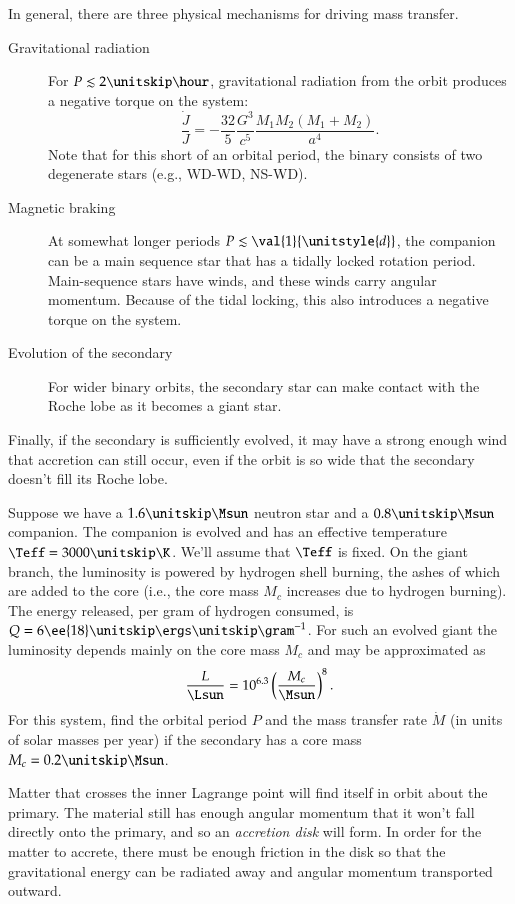 In general, there are three physical mechanisms for driving mass transfer.
\begin{description}
\item[Gravitational radiation] For $P \lesssim 2\nsp\hour$, gravitational radiation from the orbit produces a negative torque on the system:
\begin{equation}\label{e.GR-torque}
\frac{\dot{J}}{J} = -\frac{32}{5}\frac{G^{3}}{c^{5}}\frac{M_{1}M_{2}(M_{1}+M_{2})}{a^{4}}.
\end{equation}
Note that for this short of an orbital period, the binary consists of two degenerate stars (e.g., WD-WD, NS-WD).
\item[Magnetic braking] At somewhat longer periods $P \lesssim \val{1}{\unitstyle{d}}$, the companion can be a main sequence star that has a tidally locked rotation period.  Main-sequence stars have winds, and these winds carry angular momentum.  Because of the tidal locking, this also introduces a negative torque on the system.
\item[Evolution of the secondary] For wider binary orbits, the secondary star can make contact with the Roche lobe as it becomes a giant star.
\end{description}
Finally, if the secondary is sufficiently evolved, it may have a strong enough wind that accretion can still occur, even if the orbit is so wide that the secondary doesn't fill its Roche lobe.


\begin{exercisebox}
Suppose we have a $1.6\nsp\Msun$ neutron star and a $0.8\nsp\Msun$ companion.  The companion is evolved and has an effective temperature $\Teff = 3000\nsp\K$.  We'll assume that $\Teff$ is fixed.  On the giant branch, the luminosity is powered by hydrogen shell burning, the ashes of which are added to the core (i.e., the core mass $M_{c}$ increases due to hydrogen burning).  The energy released, per gram of hydrogen consumed, is $Q = 6\ee{18}\nsp\ergs\usp\gram^{-1}$. For such an evolved giant the luminosity depends mainly on the core mass $M_{c}$ and may be approximated as%
\[
	\frac{L}{\Lsun} = 10^{6.3}\left(\frac{M_{c}}{\Msun}\right)^{8}.
\]
For this system, find the orbital period $P$ and the mass transfer rate $\dot{M}$ (in units of solar masses per year) if the secondary has a core mass $M_{c} = 0.2\nsp\Msun$. 
\end{exercisebox}

Matter that crosses the inner Lagrange point will find itself in orbit about the primary.  The material still has enough angular momentum that it won't fall directly onto the primary, and so an \emph{accretion disk} will form. In order for the matter to accrete, there must be enough friction in the disk so that the gravitational energy can be radiated away and angular momentum transported outward.

